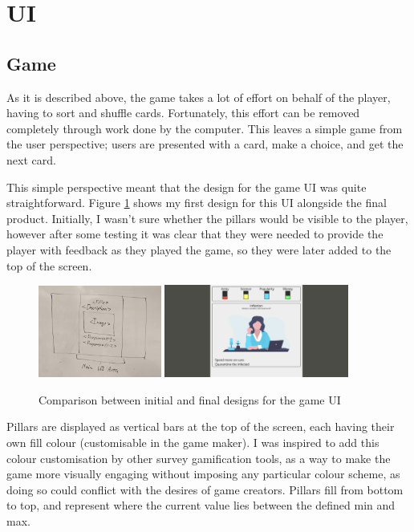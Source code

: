 \section{UI}

\subsection{Game}
As it is described above, the game takes a lot of effort on behalf of the player, having to sort and shuffle cards. Fortunately, this effort can be removed completely through work done by the computer. This leaves a simple game from the user perspective; users are presented with a card, make a choice, and get the next card.

This simple perspective meant that the design for the game UI was quite straightforward. Figure \ref{fig:game_comp} shows my first design for this UI alongside the final product. Initially, I wasn't sure whether the pillars would be visible to the player, however after some testing it was clear that they were needed to provide the player with feedback as they played the game, so they were later added to the top of the screen.

\begin{figure}[!h]
	\centering
	\includegraphics[width=0.36\textwidth]{./images/design/game_drawing.jpg}
	\includegraphics[width=0.54\textwidth]{./images/design/game.png}
	\caption{Comparison between initial and final designs for the game UI}
	\label{fig:game_comp}
\end{figure}

Pillars are displayed as vertical bars at the top of the screen, each having their own fill colour (customisable in the game maker). I was inspired to add this colour customisation by other survey gamification tools, as a way to make the game more visually engaging without imposing any particular colour scheme, as doing so could conflict with the desires of game creators. Pillars fill from bottom to top, and represent where the current value lies between the defined min and max.

